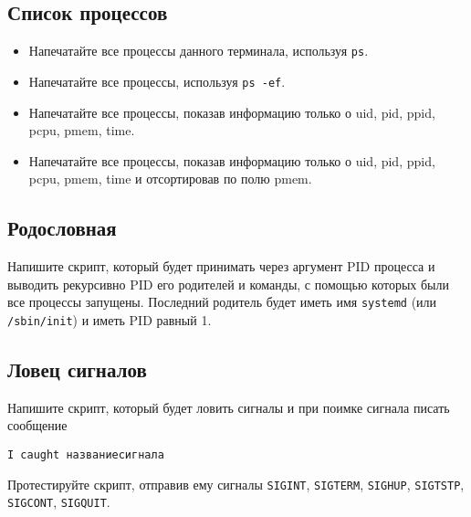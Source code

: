 \documentclass{article}
\begin{document}
\begin{enumerate}[(a)]
\subsection{Список процессов}
\begin{itemize}
\item Напечатайте все процессы данного терминала, используя \texttt{ps}.
\item Напечатайте все процессы, используя \texttt{ps -ef}.
\item Напечатайте все процессы, показав информацию только о uid, pid, ppid, pcpu, pmem, time.
\item Напечатайте все процессы, показав информацию только о uid, pid, ppid, pcpu, pmem, time и отсортировав по полю pmem.
\end{itemize}


\subsection{Родословная}
Напишите скрипт, который будет принимать через аргумент PID процесса и выводить рекурсивно PID его родителей и команды, с помощью которых были все процессы запущены. Последний родитель будет иметь имя \texttt{systemd} (или \texttt{/sbin/init}) и иметь PID равный 1.


\subsection{Ловец сигналов}
Напишите скрипт, который будет ловить сигналы и при поимке сигнала писать сообщение
\begin{lstlisting}
I caught названиесигнала
\end{lstlisting}
Протестируйте скрипт, отправив ему сигналы \texttt{SIGINT},  \texttt{SIGTERM},  \texttt{SIGHUP},  \texttt{SIGTSTP},  \texttt{SIGCONT},  \texttt{SIGQUIT}.



\end{enumerate}
\end{document}
